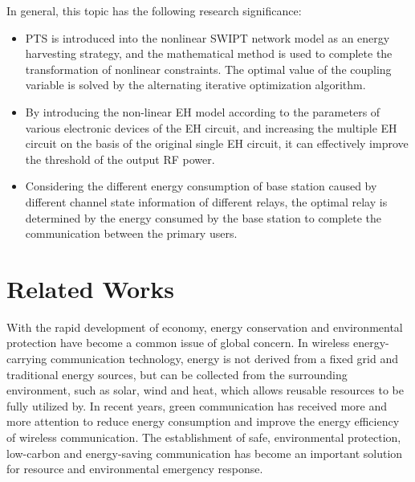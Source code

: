 \documentclass[conference]{IEEEtran}
\begin{document}
In general, this topic has the following research significance:
\begin{itemize}
\item PTS is introduced into the nonlinear SWIPT network model as an energy harvesting strategy, and the mathematical method is used to complete the transformation of nonlinear constraints. The optimal value of the coupling variable is solved by the alternating iterative optimization algorithm.
\item By introducing the non-linear EH model according to the parameters of various electronic devices of the EH circuit, and increasing the multiple EH circuit on the basis of the original single EH circuit, it can effectively improve the threshold of the output RF power.
\item Considering the different energy consumption of base station caused by different channel state information of different relays, the optimal relay is determined by the energy consumed by the base station to complete the communication between the primary users. 
\end{itemize}

\section{Related Works}

With the rapid development of economy, energy conservation and environmental protection have become a common issue of global concern. In wireless energy-carrying communication technology, energy is not derived from a fixed grid and traditional energy sources, but can be collected from the surrounding environment, such as solar, wind and heat, which allows reusable resources to be fully utilized by. In recent years, green communication has received more and more attention to reduce energy consumption and improve the energy efficiency of wireless communication. The establishment of safe, environmental protection, low-carbon and energy-saving communication has become an important solution for resource and environmental emergency response.
 
\end{document}
